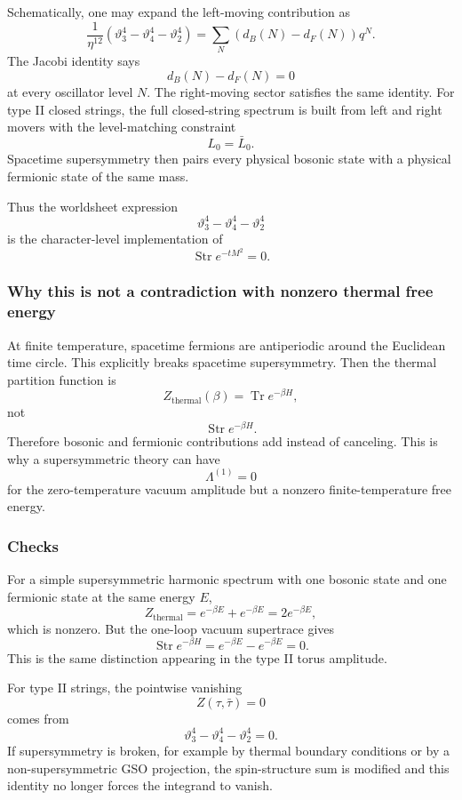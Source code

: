 \documentclass[
  10pt,
  a4paper,
  openany]{book}
\begin{document}
Schematically, one may expand the left-moving contribution as \[
\frac{1}{\eta^{12}}
\left(
\vartheta_3^4-\vartheta_4^4-\vartheta_2^4
\right)
=
\sum_N
\left(d_B(N)-d_F(N)\right)q^N.
\] The Jacobi identity says \[
d_B(N)-d_F(N)=0
\] at every oscillator level \(N\). The right-moving sector satisfies
the same identity. For type II closed strings, the full closed-string
spectrum is built from left and right movers with the level-matching
constraint \[
L_0=\bar L_0.
\] Spacetime supersymmetry then pairs every physical bosonic state with
a physical fermionic state of the same mass.

Thus the worldsheet expression \[
\vartheta_3^4-\vartheta_4^4-\vartheta_2^4
\] is the character-level implementation of \[
\operatorname{Str}e^{-tM^2}=0.
\]

\subsubsection{Why this is not a contradiction with nonzero thermal free
energy}\label{why-this-is-not-a-contradiction-with-nonzero-thermal-free-energy}

At finite temperature, spacetime fermions are antiperiodic around the
Euclidean time circle. This explicitly breaks spacetime supersymmetry.
Then the thermal partition function is \[
Z_{\mathrm{thermal}}(\beta)
=
\operatorname{Tr}e^{-\beta H},
\] not \[
\operatorname{Str}e^{-\beta H}.
\] Therefore bosonic and fermionic contributions add instead of
canceling. This is why a supersymmetric theory can have \[
\Lambda^{(1)}=0
\] for the zero-temperature vacuum amplitude but a nonzero
finite-temperature free energy.

\subsubsection{Checks}\label{checks-5}

For a simple supersymmetric harmonic spectrum with one bosonic state and
one fermionic state at the same energy \(E\), \[
Z_{\mathrm{thermal}}
=
e^{-\beta E}+e^{-\beta E}
=
2e^{-\beta E},
\] which is nonzero. But the one-loop vacuum supertrace gives \[
\operatorname{Str}e^{-\beta H}
=
e^{-\beta E}-e^{-\beta E}
=
0.
\] This is the same distinction appearing in the type II torus
amplitude.

For type II strings, the pointwise vanishing \[
Z(\tau,\bar\tau)=0
\] comes from \[
\vartheta_3^4-\vartheta_4^4-\vartheta_2^4=0.
\] If supersymmetry is broken, for example by thermal boundary
conditions or by a non-supersymmetric GSO projection, the spin-structure
sum is modified and this identity no longer forces the integrand to
vanish.
\end{document}
